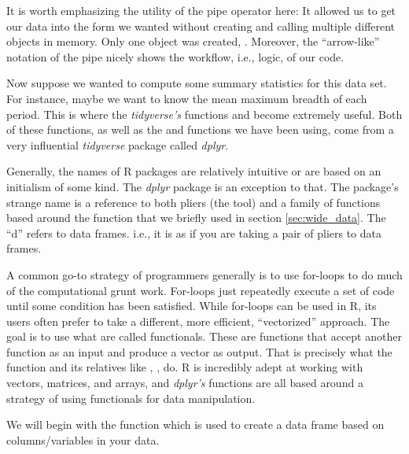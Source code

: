 It is worth emphasizing the utility of the pipe operator here: It allowed us to get our data into the form we wanted without creating and calling multiple different objects in memory. Only one object was created, . Moreover, the ``arrow-like'' notation of the pipe \R{|>} nicely shows the workflow, i.e., logic, of our code.

Now suppose we wanted to compute some summary statistics for this data set.  For instance, maybe we want to know the mean maximum breadth of each period. This is where the \textit{tidyverse's} functions  and  become extremely useful. Both of these functions, as well as the  and  functions we have been using, come from a very influential \textit{tidyverse} package called \textit{dplyr}. 

\begin{mdframed}[nobreak = true, style = miscFrame, frametitle = \Large\IMFellEnglish Box 3.1: Why is it called \textit{dplyr}?]
\color{darkgray}
\IMFellEnglish

Generally, the names of R packages are relatively intuitive or are based on an initialism of some kind. The \textit{dplyr} package is an exception to that. The package's strange name is a reference to both pliers (the tool) and a family of functions based around the  function that we briefly used in section \ref{sec:wide_data}. The \enquote{d} refers to data frames. i.e., it is as if you are taking a pair of pliers to data frames.

A common go-to strategy of programmers generally is to use for-loops to do much of the computational grunt work. For-loops just repeatedly execute a set of code until some condition has been satisfied. While for-loops can be used in R, its users often prefer to take a different, more efficient, \enquote{vectorized} approach. The goal is to use what are called \glspl{functional}. These are functions that accept another function as an input and produce a vector as output. That is precisely what the  function and its relatives like , ,  do. R is incredibly adept at working with vectors, matrices, and arrays, and \textit{dplyr's} functions are all based around a strategy of using functionals for data manipulation.
\end{mdframed}

We will begin with the  function which is used to create a data frame based on columns/variables in your data.

